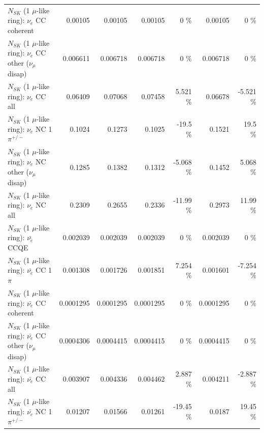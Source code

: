 \begin{table}
\begin{tabular}{| l | r | r | r  r | r  r |}
                               $N_{SK}$ (1 $\mu$-like ring): $\nu_e$ CC coherent &         0.00105 &         0.00105 &         0.00105 &        0 \%  &         0.00105 &        0 \%  \\ 
                $N_{SK}$ (1 $\mu$-like ring): $\nu_e$ CC other ($\nu_\mu$ disap) &        0.006611 &        0.006718 &        0.006718 &        0 \%  &        0.006718 &        0 \%  \\ 
                                  $N_{SK}$ (1 $\mu$-like ring): $\nu_{e}$ CC all &         0.06409 &         0.07068 &         0.07458 &    5.521 \%  &         0.06678 &   -5.521 \%  \\ 
\hline
                           $N_{SK}$ (1 $\mu$-like ring): $\nu_e$ NC 1$\pi^{+/-}$ &          0.1024 &          0.1273 &          0.1025 &    -19.5 \%  &          0.1521 &     19.5 \%  \\ 
                $N_{SK}$ (1 $\mu$-like ring): $\nu_e$ NC other ($\nu_\mu$ disap) &          0.1285 &          0.1382 &          0.1312 &   -5.068 \%  &          0.1452 &    5.068 \%  \\ 
                                  $N_{SK}$ (1 $\mu$-like ring): $\nu_{e}$ NC all &          0.2309 &          0.2655 &          0.2336 &   -11.99 \%  &          0.2973 &    11.99 \%  \\ 
\hline
\hline
\hline
                                $N_{SK}$ (1 $\mu$-like ring): $\bar{\nu_e}$ CCQE &        0.002039 &        0.002039 &        0.002039 &        0 \%  &        0.002039 &        0 \%  \\ 
                           $N_{SK}$ (1 $\mu$-like ring): $\bar{\nu_e}$ CC 1$\pi$ &        0.001308 &        0.001726 &        0.001851 &    7.254 \%  &        0.001601 &   -7.254 \%  \\ 
                         $N_{SK}$ (1 $\mu$-like ring): $\bar{\nu_e}$ CC coherent &       0.0001295 &       0.0001295 &       0.0001295 &        0 \%  &       0.0001295 &        0 \%  \\ 
          $N_{SK}$ (1 $\mu$-like ring): $\bar{\nu_e}$ CC other ($\nu_\mu$ disap) &       0.0004306 &       0.0004415 &       0.0004415 &        0 \%  &       0.0004415 &        0 \%  \\ 
                            $N_{SK}$ (1 $\mu$-like ring): $\bar{\nu_{e}}$ CC all &        0.003907 &        0.004336 &        0.004462 &    2.887 \%  &        0.004211 &   -2.887 \%  \\ 
\hline
                     $N_{SK}$ (1 $\mu$-like ring): $\bar{\nu_e}$ NC 1$\pi^{+/-}$ &         0.01207 &         0.01566 &         0.01261 &   -19.45 \%  &          0.0187 &    19.45 \%  \\ 

\end{tabular}
\end{table}
